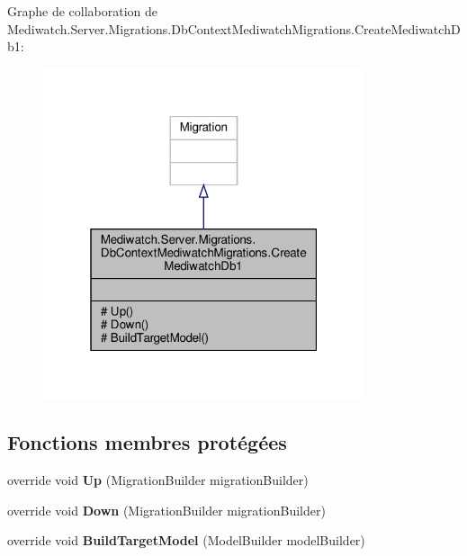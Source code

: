 Graphe de collaboration de Mediwatch.\+Server.\+Migrations.\+Db\+Context\+Mediwatch\+Migrations.\+Create\+Mediwatch\+Db1\+:\nopagebreak
\begin{figure}[H]
\begin{center}
\leavevmode
\includegraphics[width=268pt]{class_mediwatch_1_1_server_1_1_migrations_1_1_db_context_mediwatch_migrations_1_1_create_mediwatch_db1__coll__graph}
\end{center}
\end{figure}
\subsection*{Fonctions membres protégées}
\begin{DoxyCompactItemize}
\item 
\mbox{\label{class_mediwatch_1_1_server_1_1_migrations_1_1_db_context_mediwatch_migrations_1_1_create_mediwatch_db1_a9910c8d305cc20413878b58c0e75187d}} 
override void {\bfseries Up} (Migration\+Builder migration\+Builder)
\item 
\mbox{\label{class_mediwatch_1_1_server_1_1_migrations_1_1_db_context_mediwatch_migrations_1_1_create_mediwatch_db1_a06d022f49f792f45be01edb7b269b09e}} 
override void {\bfseries Down} (Migration\+Builder migration\+Builder)
\item 
\mbox{\label{class_mediwatch_1_1_server_1_1_migrations_1_1_db_context_mediwatch_migrations_1_1_create_mediwatch_db1_a4d319a2c51e1a5f8cfc06ee1da55dbcd}} 
override void {\bfseries Build\+Target\+Model} (Model\+Builder model\+Builder)
\end{DoxyCompactItemize}


